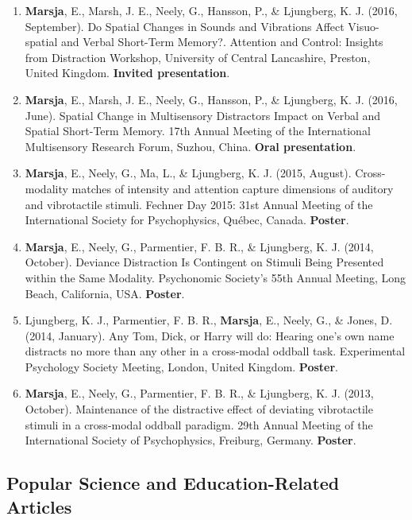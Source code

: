 \documentclass[]{article}
\begin{document}
\begin{enumerate}
  domain-specificity of short-term memory: Insights from a multisensory
  distraction paradigm. Re-thinking the Senses Spring School, Dubrovnik,
  Croatia. \textbf{Poster}.
\item
  \textbf{Marsja}, E., Marsh, J. E., Neely, G., Hansson, P., \&
  Ljungberg, K. J. (2016, September). Do Spatial Changes in Sounds and
  Vibrations Affect Visuo-spatial and Verbal Short-Term Memory?.
  Attention and Control: Insights from Distraction Workshop, University
  of Central Lancashire, Preston, United Kingdom. \textbf{Invited
  presentation}.
\item
  \textbf{Marsja}, E., Marsh, J. E., Neely, G., Hansson, P., \&
  Ljungberg, K. J. (2016, June). Spatial Change in Multisensory
  Distractors Impact on Verbal and Spatial Short-Term Memory. 17th
  Annual Meeting of the International Multisensory Research Forum,
  Suzhou, China. \textbf{Oral presentation}.
\item
  \textbf{Marsja}, E., Neely, G., Ma, L., \& Ljungberg, K. J. (2015,
  August). Cross-modality matches of intensity and attention capture
  dimensions of auditory and vibrotactile stimuli. Fechner Day 2015:
  31st Annual Meeting of the International Society for Psychophysics,
  Québec, Canada. \textbf{Poster}.
\item
  \textbf{Marsja}, E., Neely, G., Parmentier, F. B. R., \& Ljungberg, K.
  J. (2014, October). Deviance Distraction Is Contingent on Stimuli
  Being Presented within the Same Modality. Psychonomic Society's 55th
  Annual Meeting, Long Beach, California, USA. \textbf{Poster}.
\item
  Ljungberg, K. J., Parmentier, F. B. R., \textbf{Marsja}, E., Neely,
  G., \& Jones, D. (2014, January). Any Tom, Dick, or Harry will do:
  Hearing one's own name distracts no more than any other in a
  cross-modal oddball task. Experimental Psychology Society Meeting,
  London, United Kingdom. \textbf{Poster}.
\item
  \textbf{Marsja}, E., Neely, G., Parmentier, F. B. R., \& Ljungberg, K.
  J. (2013, October). Maintenance of the distractive effect of deviating
  vibrotactile stimuli in a cross-modal oddball paradigm. 29th Annual
  Meeting of the International Society of Psychophysics, Freiburg,
  Germany. \textbf{Poster}.
\end{enumerate}

\subsection{Popular Science and Education-Related
Articles}\label{popular-science-and-education-related-articles}
\end{document}
